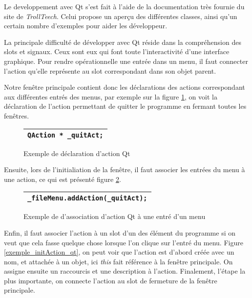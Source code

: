 \par
Le developpement avec Qt s'est fait \`a l'aide de la documentation tr\`es fournie du site de \textit{TrollTeech}. Celui propose un aper\c cu des diff\'erentes classes, ainsi qu'un certain nombre d'exemples pour aider les d\'eveloppeur.
\par
La principale difficult\'e de d\'evelopper avec Qt r\'eside dans la compr\'ehension des slots et signaux. Ceux sont eux qui font toute l'interactivit\'e d'une interface graphique. Pour rendre op\'erationnelle une entr\'ee dans un menu, il faut connecter l'action qu'elle repr\'esente au slot correspondant dans son objet parent.
\par
Notre fen\^etre principale contient donc les d\'eclarations des actions correspondant aux diff\'erentes entr\'es des menus, par exemple sur la figure \ref{exemple_action_qt}, on voit la d\'eclaration de l'action permettant de quitter le programme en fermant toutes les fen\^etres.
\begin{figure}[H]
   \begin{center}
      \begin{tabular}{l}
         \hline
         \verb|QAction * _quitAct;|\\
         \hline
      \end{tabular}
   \end{center}
\caption{\label{exemple_action_qt} Exemple de d\'eclaration d'action Qt}
\end{figure}
Ensuite, lors de l'initialiation de la fen\^etre, il faut associer les 
entr\'ees du menu \`a une action, ce qui est pr\'esent\'e figure \ref{exemple_menu_qt}.

\begin{figure}[H]
   \begin{center}
      \begin{tabular}{l}
         \hline
         \verb|_fileMenu.addAction(_quitAct);|\\
         \hline
      \end{tabular}
   \end{center}
\caption{\label{exemple_menu_qt} Exemple de d'association d'action Qt \`a une entr\'e d'un menu}
\end{figure}

Enfin, il faut associer l'action \`a un slot d'un des \'el\'ement du programme si on veut que cela fasse quelque chose lorsque l'on clique sur l'entr\'e du menu. Figure \ref{exemple_initAction_qt}, on peut voir que l'action est d'abord cr\'e\'ee avec un nom, et attach\'ee \`a un objet, ici \textit{this} fait r\'ef\'erence \`a la fen\^etre principale. On assigne ensuite un raccourcis et une description \`a l'action. Finalement, l'\'etape la plus importante, on connecte l'action au slot de fermeture de la fen\^etre principale.

